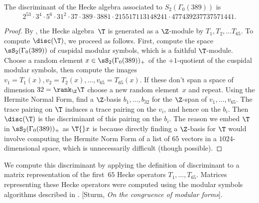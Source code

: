 \documentclass{report}
\begin{document}
\begin{proposition}
The discriminant of the Hecke algebra associated to
$S_2(\Gamma_0(389))$ is
$$
  2^{53}\cdot{}3^4\cdot{}5^6\cdot{}31^2\cdot{}37\cdot{}389
  \cdot{}3881\cdot{}215517113148241\cdot{}477439237737571441.
$$
\end{proposition}
\begin{proof}
By \cite{agashe-stein:schoof-appendix}, the Hecke algebra~$\T$
is generated as a $\Z$-module by $T_1,T_2,\ldots T_{65}$.
To compute $\disc(\T)$, we proceed as follows.
First, compute the space $\sS_2(\Gamma_0(389))$ of
cuspidal modular symbols, which is a faithful $\T$-module.
Choose a random element $x\in \sS_2(\Gamma_0(389))_+$ of the $+1$-quotient
of the cuspidal modular symbols, then compute the
images $v_1=T_1(x), v_2=T_2(x), \ldots, v_{65}=T_{65}(x)$.  If these don't span
a space of dimension $32=\rank_\Z \T$ choose a new random element~$x$
and repeat.  Using the Hermite Normal Form, find a $\Z$-basis $b_1,\ldots, b_{32}$ for
the $\Z$-span of $v_1,\ldots, v_{65}$.   The trace pairing on $\T$ induces a trace
pairing on the $v_i$, and hence on the $b_i$.  Then $\disc(\T)$ is the discriminant
of this pairing on the $b_i$.   The reason we embed $\T$ in $\sS_2(\Gamma_0(389))_+$
as $\T{}x$ is because directly finding a $\Z$-basis for $\T$ would involve computing
the Hermite Norm Form of a list of $65$ vectors in a $1024$-dimensional space, which
is unnecessarily difficult (though possible).
\end{proof}



We compute this discriminant by applying the definition of
discriminant to a matrix representation of the first~$65$ Hecke
operators $T_1,\ldots, T_{65}$.  Matrices representing these
Hecke operators were computed using the modular symbols algorithms
described in \cite{cremona:algs}.
[Sturm, {\em On the congruence of modular forms}].


\end{document}
